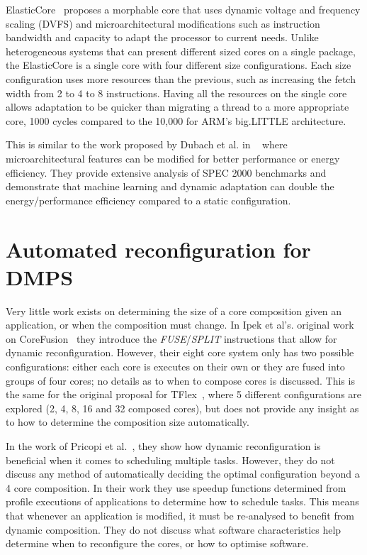 ElasticCore~\cite{tavanaElastic} proposes a morphable core that uses dynamic voltage and frequency scaling (DVFS) and microarchitectural modifications such as instruction bandwidth and capacity to adapt the processor to current needs.
Unlike heterogeneous systems that can present different sized cores on a single package, the ElasticCore is a single core with four different size configurations.
Each size configuration uses more resources than the previous, such as increasing the fetch width from 2 to 4 to 8 instructions.
Having all the resources on the single core allows adaptation to be quicker than migrating a thread to a  more appropriate core, 1000 cycles compared to the 10,000 for ARM's big.LITTLE architecture.

This is similar to the work proposed by Dubach et al. in ~\cite{dubach13dynamic} where microarchitectural features can be modified for better performance or energy efficiency.
They provide extensive analysis of SPEC 2000 benchmarks and demonstrate that machine learning and dynamic adaptation can double the energy/performance efficiency compared to a static configuration.


\section{Automated reconfiguration for DMPS}

Very little work exists on determining the size of a core composition given an application, or when the composition must change.
In Ipek et al's. original work on CoreFusion~\cite{ipek2007CoreFusion} they introduce the \textit{FUSE}/\textit{SPLIT} instructions that allow for dynamic reconfiguration.
However, their eight core system only has two possible configurations: either each core is executes on their own or they are fused into groups of four cores; no details as to when to compose cores is discussed.
This is the same for the original proposal for TFlex~\cite{kim2007tflex}, where 5 different configurations are explored (2, 4, 8, 16 and 32 composed cores), but does not provide any insight as to how to determine the composition size automatically.

In the work of Pricopi et al.~\cite{pricopiSchedCoreComp2014}, they show how dynamic reconfiguration is beneficial when it comes to scheduling multiple tasks.
However, they do not discuss any method of automatically deciding the optimal configuration beyond a 4 core composition.
In their work they use speedup functions determined from profile executions of applications to determine how to schedule tasks.
This means that whenever an application is modified, it must be re-analysed to benefit from dynamic composition.
They do not discuss what software characteristics help determine when to reconfigure the cores, or how to optimise software.

